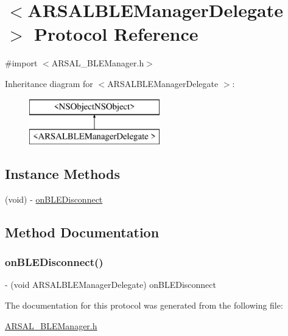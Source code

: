 \hypertarget{protocolARSALBLEManagerDelegate_01-p}{}\section{$<$A\+R\+S\+A\+L\+B\+L\+E\+Manager\+Delegate $>$ Protocol Reference}
\label{protocolARSALBLEManagerDelegate_01-p}


{\ttfamily \#import $<$A\+R\+S\+A\+L\+\_\+\+B\+L\+E\+Manager.\+h$>$}

Inheritance diagram for $<$A\+R\+S\+A\+L\+B\+L\+E\+Manager\+Delegate $>$\+:\begin{figure}[H]
\begin{center}
\leavevmode
\includegraphics[height=2.000000cm]{protocolARSALBLEManagerDelegate_01-p}
\end{center}
\end{figure}
\subsection*{Instance Methods}
\begin{DoxyCompactItemize}
\item 
(void) -\/ \hyperlink{protocolARSALBLEManagerDelegate_01-p_aaf4b420056f1e8f8808c110f426e61d1}{on\+B\+L\+E\+Disconnect}
\end{DoxyCompactItemize}


\subsection{Method Documentation}
\hypertarget{protocolARSALBLEManagerDelegate_01-p_aaf4b420056f1e8f8808c110f426e61d1}{}\label{protocolARSALBLEManagerDelegate_01-p_aaf4b420056f1e8f8808c110f426e61d1} 
\subsubsection{\texorpdfstring{on\+B\+L\+E\+Disconnect()}{onBLEDisconnect()}}
{\footnotesize\ttfamily -\/ (void A\+R\+S\+A\+L\+B\+L\+E\+Manager\+Delegate) on\+B\+L\+E\+Disconnect \begin{DoxyParamCaption}{ }\end{DoxyParamCaption}\hspace{0.3cm}{\ttfamily [required]}}



The documentation for this protocol was generated from the following file\+:\begin{DoxyCompactItemize}
\item 
\hyperlink{ARSAL__BLEManager_8h}{A\+R\+S\+A\+L\+\_\+\+B\+L\+E\+Manager.\+h}\end{DoxyCompactItemize}
